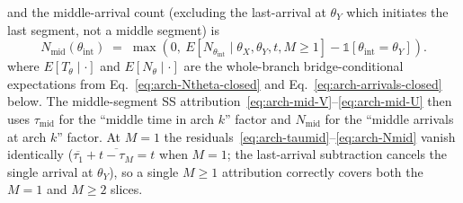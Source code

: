 and the middle-arrival count (excluding the last-arrival at $\theta_Y$
which initiates the last segment, not a middle segment) is
\begin{equation}
  N_{\text{mid}}(\theta_{\text{int}})
  \;=\;
  \max\!\left(0,\
    E[N_{\theta_{\text{int}}} \mid \theta_X, \theta_Y, t, M \geq 1]
    - \mathbb{1}[\theta_{\text{int}} = \theta_Y]
  \right).
  \label{eq:arch-Nmid}
\end{equation}
where $E[T_\theta \mid \cdot]$ and $E[N_\theta \mid \cdot]$ are the
whole-branch bridge-conditional expectations from
Eq.~\ref{eq:arch-Ntheta-closed} and
Eq.~\ref{eq:arch-arrivals-closed} below. The middle-segment SS
attribution~\eqref{eq:arch-mid-V}--\eqref{eq:arch-mid-U} then uses
$\tau_{\text{mid}}$ for the ``middle time in arch $k$'' factor and
$N_{\text{mid}}$ for the ``middle arrivals at arch $k$'' factor. At
$M = 1$ the residuals~\eqref{eq:arch-taumid}--\eqref{eq:arch-Nmid}
vanish identically ($\overline{\tau_1} + \overline{t - \tau_M} = t$
when $M = 1$; the last-arrival subtraction cancels the single arrival
at $\theta_Y$), so a single $M \geq 1$ attribution correctly covers
both the $M = 1$ and $M \geq 2$ slices.

